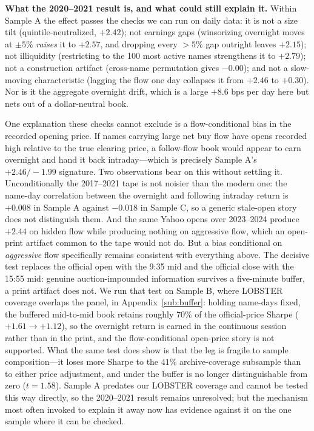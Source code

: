\documentclass[11pt]{article}
\begin{document}
\textbf{What the 2020--2021 result is, and what could still explain it.} Within Sample A the effect passes the checks we can run on daily data: it is not a size tilt (quintile-neutralized, $+2.42$); not earnings gaps (winsorizing overnight moves at $\pm5\%$ \emph{raises} it to $+2.57$, and dropping every $>\!5\%$ gap outright leaves $+2.15$); not illiquidity (restricting to the 100 most active names strengthens it to $+2.79$); not a construction artifact (cross-name permutation gives $-0.00$); and not a slow-moving characteristic (lagging the flow one day collapses it from $+2.46$ to $+0.30$). Nor is it the aggregate overnight drift, which is a large $+8.6$ bps per day here but nets out of a dollar-neutral book.

One explanation these checks cannot exclude is a flow-conditional bias in the recorded opening price. If names carrying large net buy flow have opens recorded high relative to the true clearing price, a follow-flow book would appear to earn overnight and hand it back intraday---which is precisely Sample A's $+2.46 / -1.99$ signature. Two observations bear on this without settling it. Unconditionally the 2017--2021 tape is not noisier than the modern one: the name-day correlation between the overnight and following intraday return is $+0.008$ in Sample A against $-0.018$ in Sample C, so a generic stale-open story does not distinguish them. And the same Yahoo opens over 2023--2024 produce $+2.44$ on hidden flow while producing nothing on aggressive flow, which an open-print artifact common to the tape would not do. But a bias conditional on \emph{aggressive} flow specifically remains consistent with everything above. The decisive test replaces the official open with the 9:35 mid and the official close with the 15:55 mid: genuine auction-impounded information survives a five-minute buffer, a print artifact does not. We run that test on Sample B, where LOBSTER coverage overlaps the panel, in Appendix~\ref{sub:buffer}: holding name-days fixed, the buffered mid-to-mid book retains roughly $70\%$ of the official-price Sharpe ($+1.61 \to +1.12$), so the overnight return is earned in the continuous session rather than in the print, and the flow-conditional open-price story is not supported. What the same test does show is that the leg is fragile to sample composition---it loses more Sharpe to the $41\%$ archive-coverage subsample than to either price adjustment, and under the buffer is no longer distinguishable from zero ($t=1.58$). Sample A predates our LOBSTER coverage and cannot be tested this way directly, so the 2020--2021 result remains unresolved; but the mechanism most often invoked to explain it away now has evidence against it on the one sample where it can be checked.
\end{document}
